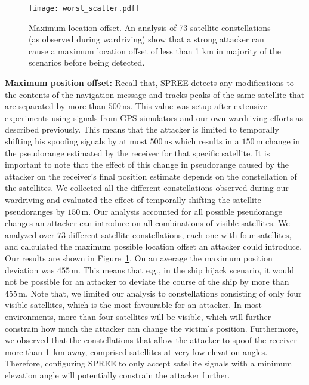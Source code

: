 \documentclass[letterpaper,twocolumn,10pt]{article}
\newcommand{\eg}{e.g.,\xspace}
\newcommand{\unit}[1]{\ensuremath{\, \mathrm{#1}}}
\newcommand{\rxname}{SPREE\xspace}
\begin{document}
\begin{figure}[t]
\centering
  \texttt{[image: worst\_scatter.pdf]}
  \caption{Maximum location offset. An analysis of 73 satellite constellations (as observed during wardriving) show that a strong attacker can cause a maximum location offset of less than 1 km in majority of the scenarios before being detected.}
  \label{fig:constellation}
\end{figure}


\noindent\textbf{Maximum position offset:} Recall that, \rxname detects any modifications to the contents of the navigation message and tracks peaks of the same satellite that are separated by more than $500\unit{ns}$. This value was setup after extensive experiments using signals from GPS simulators and our own wardriving efforts as described previously. This means that the attacker is limited to temporally shifting his spoofing signals by at most $500\unit{ns}$ which results in a $150\unit{m}$ change in the pseudorange estimated by the receiver for that specific satellite. It is important to note that the effect of this change in pseudorange caused by the attacker on the receiver's final position estimate depends on the constellation of the satellites. We collected all the different constellations observed during our wardriving and evaluated the effect of temporally shifting the satellite pseudoranges by $150\unit{m}$. Our analysis accounted for all possible pseudorange changes an attacker can introduce on all combinations of visible satellites. We analyzed over $73$ different satellite constellations, each one with four satellites, and calculated the maximum possible location offset an attacker could introduce. Our results are shown in Figure~\ref{fig:constellation}. On an average the maximum position deviation was $455\unit{m}$. This means that \eg in the ship hijack scenario, it would not be possible for an attacker to deviate the course of the ship by more than $455\unit{m}$. Note that, we limited our analysis to constellations consisting of only four visible satellites, which is the most favourable for an attacker. In most environments, more than four satellites will be visible, which will further constrain how much the attacker can change the victim's position. Furthermore, we observed that the constellations that allow the attacker to spoof the receiver more than 1~km away, comprised satellites at very low elevation angles. Therefore, configuring \rxname to only accept satellite signals with a minimum elevation angle will potentially constrain the attacker further.\\
\end{document}
